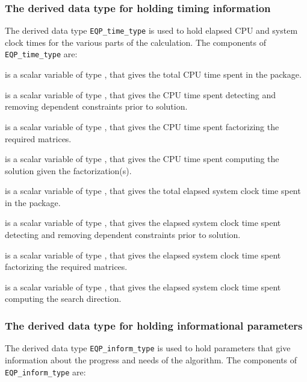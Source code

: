 \documentclass{galahad}
\newcommand{\packagename}{EQP}
\begin{document}
\subsubsection{The derived data type for holding timing 
 information}\label{typetime}
The derived data type 
{\tt \packagename\_time\_type} 
is used to hold elapsed CPU and system clock times for the various parts of 
the calculation. The components of 
{\tt \packagename\_time\_type} 
are:
\begin{description}
 is a scalar variable of type \realdp, that gives
 the total CPU time spent in the package.

 is a scalar variable of type \realdp, that gives
 the CPU time spent detecting and removing dependent constraints prior 
to solution.

 is a scalar variable of type \realdp, that gives
 the CPU time spent factorizing the required matrices.

 is a scalar variable of type \realdp, that gives
 the CPU time spent computing the solution given the factorization(s).

 is a scalar variable of type \realdp, that gives
 the total elapsed system clock time spent in the package.

 is a scalar variable of type \realdp, 
that gives  the elapsed system clock time spent detecting and removing 
dependent constraints prior to solution.

 is a scalar variable of type \realdp, that gives
 the elapsed system clock time spent factorizing the required matrices.

 is a scalar variable of type \realdp, that gives
 the elapsed system clock time spent computing the search direction.

\end{description}


\subsubsection{The derived data type for holding informational
 parameters}\label{typeinform}
The derived data type 
{\tt \packagename\_inform\_type} 
is used to hold parameters that give information about the progress and needs 
of the algorithm. The components of 
{\tt \packagename\_inform\_type} 
are:
\end{document}
